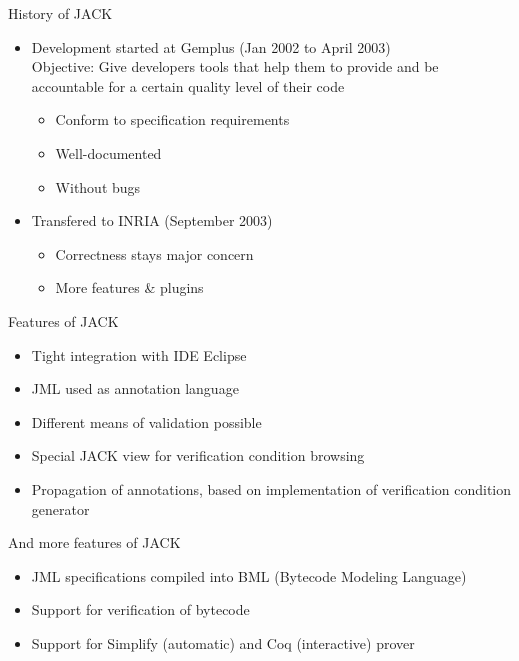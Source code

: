 \documentclass[final,nocolorBG,a4,mobius,nototal,pdf,slideColor]{prosper}
\begin{document}
\begin{slide}{History of JACK}
\begin{itemize}
\item Development started at Gemplus (Jan 2002 to April 2003)\\
Objective: Give developers tools that help them to provide and be
accountable for a certain quality level of their code
\begin{itemize}
\item Conform to specification requirements
\item Well-documented
\item Without bugs
\end{itemize}
\item Transfered to INRIA (September 2003)
\begin{itemize}
\item Correctness stays major concern
\item More features \& plugins
\end{itemize}
\end{itemize}
\end{slide}

\begin{slide}{Features of JACK}
\begin{itemize}
\item Tight integration with IDE Eclipse
\item JML used as annotation language
\item Different means of validation possible

\item Special JACK view for verification condition browsing
\item Propagation of annotations, based on implementation of
verification condition generator
\end{itemize}
\end{slide}

\begin{slide}{And more features of JACK}
\begin{itemize}
\item JML specifications compiled into BML (Bytecode Modeling Language)
\item Support for verification of bytecode 
\item Support for Simplify (automatic) and Coq (interactive) prover
\end{itemize}
\end{slide}
\end{document}
